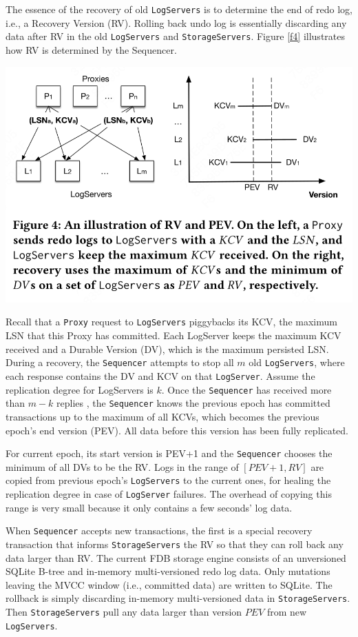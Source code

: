 \documentclass[11pt]{article}
\begin{document}
The essence of the recovery of old \texttt{LogServers} is to determine the end of redo log, i.e., a Recovery
Version (RV). Rolling back undo log is essentially discarding any data after RV in the old
\texttt{LogServers} and \texttt{StorageServers}. Figure \ref{f4} illustrates how RV is determined by the Sequencer.
\begin{center}
\includegraphics[width=.5\textwidth]{../../images/papers/112.png}
\label{f4}
\end{center}


Recall that a \texttt{Proxy} request to \texttt{LogServers} piggybacks its KCV, the maximum LSN that this Proxy has
committed. Each LogServer keeps the maximum KCV received and a Durable Version (DV), which is the
maximum persisted LSN. During a recovery, the \texttt{Sequencer} attempts to stop all \(m\) old \texttt{LogServers},
where each response contains the DV and KCV on that \texttt{LogServer}. Assume the replication degree for
LogServers is \(k\). Once the \texttt{Sequencer} has received more than \(m-k\) replies , the \texttt{Sequencer} knows
the previous epoch has committed transactions up to the maximum of all KCVs, which becomes the
previous epoch’s end version (PEV). All data before this version has been fully replicated.

For current epoch, its start version is PEV+1 and the \texttt{Sequencer} chooses the minimum of all DVs to be
the RV. Logs in the range of \([PEV+1,RV]\) are copied from previous epoch’s \texttt{LogServers} to the current
ones, for healing the replication degree in case of \texttt{LogServer} failures. The overhead of copying this
range is very small because it only contains a few seconds’ log data.

When \texttt{Sequencer} accepts new transactions, the first is a special recovery transaction that informs
\texttt{StorageServers} the RV so that they can roll back any data larger than RV. The current FDB storage
engine consists of an unversioned SQLite B-tree and in-memory multi-versioned redo log data. Only
mutations leaving the MVCC window (i.e., committed data) are written to SQLite. The rollback is simply
discarding in-memory multi-versioned data in \texttt{StorageServers}. Then \texttt{StorageServers} pull any data larger
than version \(PEV\) from new \texttt{LogServers}.
\end{document}
